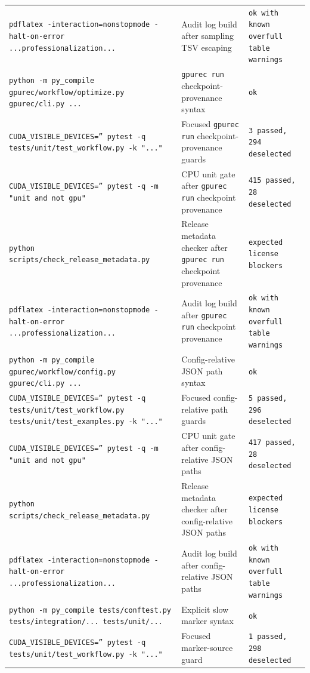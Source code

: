 \documentclass[11pt]{article}
\begin{document}
\begin{center}
\begin{tabular}{lll}
\texttt{pdflatex -interaction=nonstopmode -halt-on-error ...professionalization...} &
Audit log build after sampling TSV escaping &
\texttt{ok with known overfull table warnings} \\
\texttt{python -m py\_compile gpurec/workflow/optimize.py gpurec/cli.py ...} &
\texttt{gpurec run} checkpoint-provenance syntax &
\texttt{ok} \\
\texttt{CUDA\_VISIBLE\_DEVICES='' pytest -q tests/unit/test\_workflow.py -k "..."} &
Focused \texttt{gpurec run} checkpoint-provenance guards &
\texttt{3 passed, 294 deselected} \\
\texttt{CUDA\_VISIBLE\_DEVICES='' pytest -q -m "unit and not gpu"} &
CPU unit gate after \texttt{gpurec run} checkpoint provenance &
\texttt{415 passed, 28 deselected} \\
\texttt{python scripts/check\_release\_metadata.py} &
Release metadata checker after \texttt{gpurec run} checkpoint provenance &
\texttt{expected license blockers} \\
\texttt{pdflatex -interaction=nonstopmode -halt-on-error ...professionalization...} &
Audit log build after \texttt{gpurec run} checkpoint provenance &
\texttt{ok with known overfull table warnings} \\
\texttt{python -m py\_compile gpurec/workflow/config.py gpurec/cli.py ...} &
Config-relative JSON path syntax &
\texttt{ok} \\
\texttt{CUDA\_VISIBLE\_DEVICES='' pytest -q tests/unit/test\_workflow.py tests/unit/test\_examples.py -k "..."} &
Focused config-relative path guards &
\texttt{5 passed, 296 deselected} \\
\texttt{CUDA\_VISIBLE\_DEVICES='' pytest -q -m "unit and not gpu"} &
CPU unit gate after config-relative JSON paths &
\texttt{417 passed, 28 deselected} \\
\texttt{python scripts/check\_release\_metadata.py} &
Release metadata checker after config-relative JSON paths &
\texttt{expected license blockers} \\
\texttt{pdflatex -interaction=nonstopmode -halt-on-error ...professionalization...} &
Audit log build after config-relative JSON paths &
\texttt{ok with known overfull table warnings} \\
\texttt{python -m py\_compile tests/conftest.py tests/integration/... tests/unit/...} &
Explicit slow marker syntax &
\texttt{ok} \\
\texttt{CUDA\_VISIBLE\_DEVICES='' pytest -q tests/unit/test\_workflow.py -k "..."} &
Focused marker-source guard &
\texttt{1 passed, 298 deselected} \\

\end{tabular}
\end{center}
\end{document}
